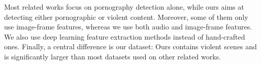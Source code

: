 Most related works focus on pornography detection alone, while ours aims at detecting either pornographic or violent content. Moreover, some of them only use image-frame features, whereas we use both audio and image-frame features. We also use deep learning feature extraction methods instead of hand-crafted ones.
Finally, a central difference is our dataset: Ours contains violent scenes and is significantly larger than most datasets used on other related works.